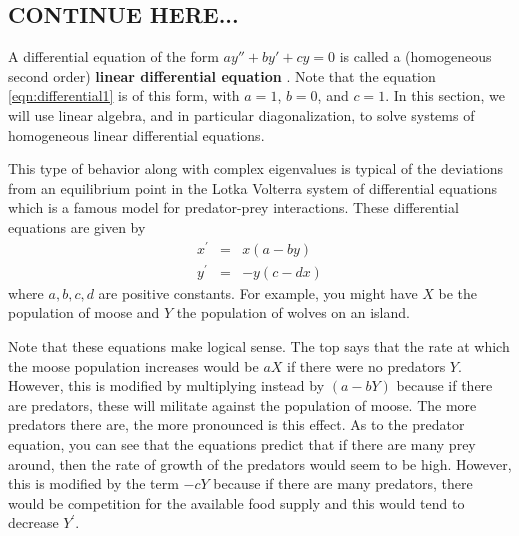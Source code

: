 \subsection{CONTINUE HERE...}

  A
differential equation of the form $ay''+by'+cy = 0$ is called a
(homogeneous second order) \textbf{linear differential equation}%
. Note
that the equation {\eqref{eqn:differential1}} is of this form, with
$a=1$, $b=0$, and $c=1$. In this section, we will use linear algebra,
and in particular diagonalization, to solve systems of homogeneous
linear differential equations.

This type of behavior along with complex eigenvalues is typical of the
deviations from an equilibrium point in the Lotka Volterra system of
differential equations which is a famous model for predator-prey
interactions. These differential equations are given by
\begin{eqnarray*}
  x^{\prime } &=&x(a-by) \\
  y^{\prime } &=&-y(c-dx)
\end{eqnarray*}
where $a,b,c,d$ are positive constants. For example, you might have
$X$ be the population of moose and $Y$ the population of wolves on an
island.

Note that these equations make logical sense. The top says that the
rate at which the moose population increases would be $aX$ if there
were no predators $Y$.  However, this is modified by multiplying
instead by $(a-bY) $ because if there are predators, these will
militate against the population of moose.  The more predators there
are, the more pronounced is this effect. As to the predator equation,
you can see that the equations predict that if there are many prey
around, then the rate of growth of the predators would seem to be
high. However, this is modified by the term $-cY$ because if there are
many predators, there would be competition for the available food
supply and this would tend to decrease $Y^{\prime }$.

